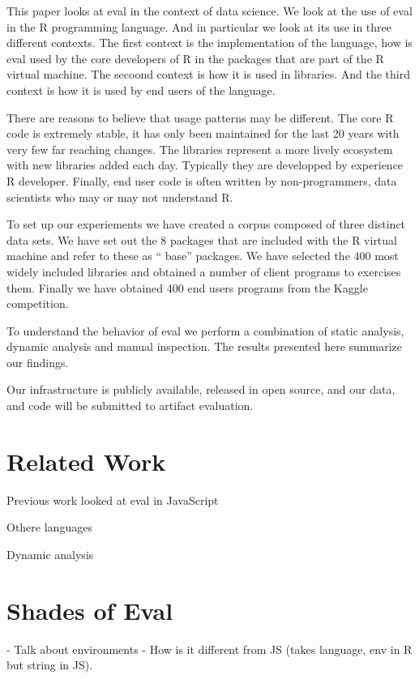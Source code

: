 \documentclass[conference]{IEEEtran}
\begin{document}
This paper looks at eval in the context of data science. We look at the use
of eval in the R programming language. And in particular we look at its use
in three different contexts.  The first context is the implementation of the
language, how is eval used by the core developers of R in the packages that
are part of the R virtual machine.  The secoond context is how it is used in
libraries. And the third context is how it is used by end users of the
language.

There are reasons to believe that usage patterns may be different. The core
R code is extremely stable, it has only been maintained for the last 20
years with very few far reaching changes. The libraries represent a more
lively ecosystem with new libraries added each day. Typically they are
developped by experience R developer.  Finally, end user code is often
written by non-programmers, data scientists who may or may not understand R.

To set up our experiements we have created a corpus composed of three
distinct data sets.  We have set out the 8 packages that are included with
the R virtual machine and refer to these as `` base'' packages.  We have
selected the 400 most widely included libraries and obtained a number of
client programs to exercises them.  Finally we have obtained 400 end users
programs from the Kaggle competition.

To understand the behavior of eval we perform a combination of static
analysis, dynamic analysis and manual inspection. The results presented
here summarize our findings.

Our infrastructure is publicly available, released in open source, and our
data, and code will be submitted to artifact evaluation.


\section{Related Work}

\cite{ecoop11}

Previous work looked at eval in JavaScript

Othere languages

Dynamic analysis


\section{Shades of Eval}

- Talk about environments
- How is it different from JS (takes language, env in R but string in JS).
\end{document}
